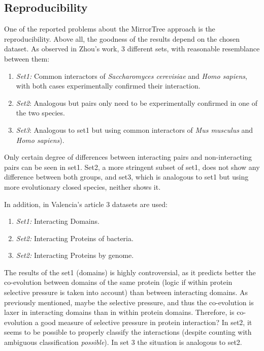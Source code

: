 \documentclass[11pt]{article}
\begin{document}
\subsection{Reproducibility}
One of the reported problems about the MirrorTree approach is the reproducibility. Above all, the goodness of the results depend on the chosen dataset. As observed in Zhou's work\cite{Zhou13}, 3 different sets, with reasonable resemblance between them:
\begin{enumerate}
\setlength{\itemsep}{1pt}
	\item \textit{Set1:} Common interactors of \textit{Saccharomyces cerevisiae} and \textit{Homo sapiens}, 		with both cases experimentally confirmed their interaction.
	\item \textit{Set2}: Analogous but pairs only need to be experimentally confirmed in one of the two 			species.
	\item \textit{Set3}: Analogous to set1 but using common interactors of \textit{Mus musculus} and   \textit{Homo sapiens}).
\end{enumerate}
Only certain degree of differences between interacting pairs and non-interacting pairs can be seen in set1. Set2, a more stringent subset of set1, does not show any difference between both groups, and set3, which is analogous to set1 but using more evolutionary closed species, neither shows it.

In addition, in Valencia's article\cite{Pazos2001} 3 datasets are used:
\begin{enumerate}
\setlength{\itemsep}{1pt}
	\item \textit{Set1:} Interacting Domains.
	\item \textit{Set2:} Interacting Proteins of bacteria.
	\item \textit{Set2:} Interacting Proteins by genome.
\end{enumerate}

The results of the set1 (domains) is highly controversial, as it predicts better the co-evolution between domains of the same protein (logic if within protein selective pressure is taken into account) than between interacting domains. As previously mentioned, maybe the selective pressure, and thus the co-evolution is laxer in interacting domains than in within protein domains. Therefore, is co-evolution a good measure of selective pressure in protein interaction?
In set2, it seems to be possible to properly classify the interactions (despite counting with ambiguous classification \textit{possible}). In set 3 the situation is analogous to set2.
\end{document}
